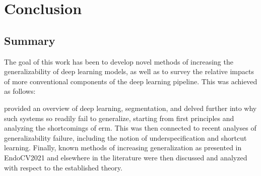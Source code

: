 \chapter{Conclusion}\label{conclusion}




 
\section{Summary}
The goal of this work has been to develop novel methods of increasing the generalizability of deep learning models, as well as to survey the relative impacts of more conventional components of the deep learning pipeline. This was achieved as follows:

 provided an overview of deep learning, segmentation, and delved further into why such systems so readily fail to generalize, starting from first principles and analyzing the shortcomings of \gls{erm}. This was then connected to recent analyses of generalizability failure, including the notion of underspecification and shortcut learning. Finally, known methods of increasing generalization as presented in EndoCV2021 and elsewhere in the literature were then discussed and analyzed with respect to the established theory. 

